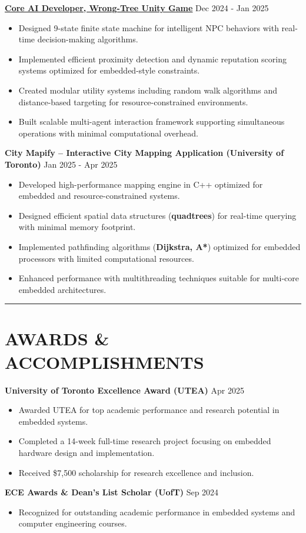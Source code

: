 \documentclass[letterpaper,10pt]{article}
\begin{document}
\vspace{0.2cm}
\noindent\href{https://github.com/XiuShw/Wrong-Tree}{\uline{
\textbf{Core AI Developer, Wrong-Tree Unity Game}}} \hfill Dec 2024 - Jan 2025
\begin{itemize}[leftmargin=0.2in]
    \item Designed 9-state finite state machine for intelligent NPC behaviors with real-time decision-making algorithms.
    \item Implemented efficient proximity detection and dynamic reputation scoring systems optimized for embedded-style constraints.
    \item Created modular utility systems including random walk algorithms and distance-based targeting for resource-constrained environments.
    \item Built scalable multi-agent interaction framework supporting simultaneous operations with minimal computational overhead.
\end{itemize}

\vspace{0.2cm}
\noindent\textbf{City Mapify – Interactive City Mapping Application (University of Toronto)} \hfill Jan 2025 - Apr 2025
\begin{itemize}[leftmargin=0.2in]
    \item Developed high-performance mapping engine in C++ optimized for embedded and resource-constrained systems.
    \item Designed efficient spatial data structures (\textbf{quadtrees}) for real-time querying with minimal memory footprint.
    \item Implemented pathfinding algorithms (\textbf{Dijkstra, A*}) optimized for embedded processors with limited computational resources.
    \item Enhanced performance with multithreading techniques suitable for multi-core embedded architectures.
\end{itemize}

\noindent\rule{\linewidth}{1pt}

\section*{\textbf{AWARDS \& ACCOMPLISHMENTS}}

\noindent\textbf{University of Toronto Excellence Award (UTEA)} \hfill Apr 2025
\begin{itemize}[leftmargin=0.2in]
    \item Awarded UTEA for top academic performance and research potential in embedded systems.
    \item Completed a 14-week full-time research project focusing on embedded hardware design and implementation.
    \item Received \$7,500 scholarship for research excellence and inclusion.
\end{itemize}

\vspace{0.2cm}
\noindent\textbf{ECE Awards \& Dean's List Scholar (UofT)} \hfill Sep 2024
\begin{itemize}[leftmargin=0.2in]
    \item Recognized for outstanding academic performance in embedded systems and computer engineering courses.
\end{itemize}
\end{document}
